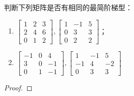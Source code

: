 \begin{problem}
判断下列矩阵是否有相同的最简阶梯型：
\begin{enumerate}
    \item \(\begin{bmatrix}1&2&3\\2&4&6\\0&1&2\end{bmatrix},\begin{bmatrix}1&-1&5\\0&3&3\\0&2&2\end{bmatrix}\)；
    \item \(\begin{bmatrix}-1&0&4\\3&0&-1\\0&1&-1\end{bmatrix},\begin{bmatrix}1&-1&5\\-1&4&-2\\0&3&3\end{bmatrix}\)
\end{enumerate}
\end{problem}
\begin{proof}

\end{proof}

